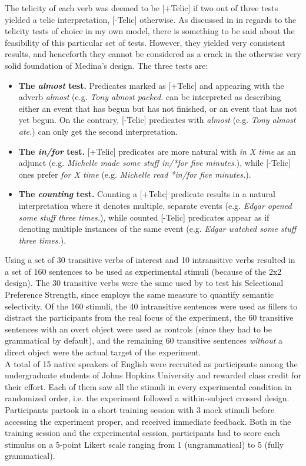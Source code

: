 The telicity of each verb was deemed to be [+Telic] if two out of three tests yielded a telic interpretation, [-Telic] otherwise. As discussed in  in regards to the telicity tests of choice in my own model, there is something to be said about the feasibility of this particular set of tests. However, they yielded very consistent results, and henceforth they cannot be considered as a crack in the otherwise very solid foundation of Medina's design. The three tests \parencite[302-303]{Medina2007} are:
\begin{itemize}
    \item \textbf{The \textit{almost} test.} Predicates marked as [+Telic] and appearing with the adverb \textit{almost} (e.g. \textit{Tony almost packed.} can be interpreted as describing either an event that has begun but has not finished, or an event that has not yet begun. On the contrary, [-Telic] predicates with \textit{almost} (e.g. \textit{Tony almost ate.}) can only get the second interpretation.
    \item \textbf{The \textit{in/for} test.} [+Telic] predicates are more natural with \textit{in X time} as an adjunct (e.g. \textit{Michelle made some stuff in/*for five minutes.}), while [-Telic] ones prefer \textit{for X time} (e.g. \textit{Michelle read *in/for five minutes.}).
    \item \textbf{The \textit{counting} test.} Counting a [+Telic] predicate results in a natural interpretation where it denotes multiple, separate events (e.g. \textit{Edgar opened some stuff three times.}), while counted [-Telic] predicates appear as if denoting multiple instances of the same event (e.g. \textit{Edgar watched some stuff three times.}).
\end{itemize}

Using a set of 30 transitive verbs of interest and 10 intransitive verbs resulted in a set of 160 sentences to be used as experimental stimuli (because of the 2x2 design). The 30 transitive verbs were the same used by \textcite{Resnik1993, Resnik1996} to test his Selectional Preference Strength, since \textcite{Medina2007} employs the same measure to quantify semantic selectivity. Of the 160 stimuli, the 40 intransitive sentences were used as fillers to distract the participants from the real focus of the experiment, the 60 transitive sentences with an overt object were used as controls (since they had to be grammatical by default), and the remaining 60 transitive sentences \textit{without} a direct object were the actual target of the experiment.\\
A total of 15 native speakers of English were recruited as participants among the undergraduate students of Johns Hopkins University and rewarded class credit for their effort. Each of them saw all the stimuli in every experimental condition in randomized order, i.e. the experiment followed a within-subject crossed design. Participants partook in a short training session with 3 mock stimuli before accessing the experiment proper, and received immediate feedback. Both in the training session and the experimental session, participants had to score each stimulus on a 5-point Likert scale ranging from 1 (ungrammatical) to 5 (fully grammatical).

